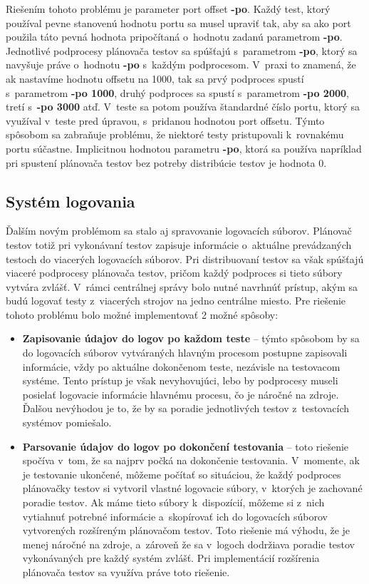 Riešením tohoto problému je parameter port offset \textbf{-po}. 
Každý test, ktorý používal pevne stanovenú hodnotu portu sa musel upraviť tak, aby 
sa ako port použila táto pevná hodnota pripočítaná o~hodnotu zadanú parametrom \textbf{-po}.
Jednotlivé podprocesy plánovača testov sa spúšťajú s~parametrom \textbf{-po}, ktorý sa
navyšuje práve o~hodnotu \textbf{-po} s~každým podprocesom.
V~praxi to znamená, že ak nastavíme hodnotu offsetu na 1000, tak sa prvý podproces spustí s~parametrom
\textbf{-po 1000}, druhý podproces sa spustí s~parametrom \textbf{-po 2000}, tretí s~\textbf{-po 3000} atď.
V~teste sa potom používa štandardné číslo portu, ktorý sa využíval v~teste pred úpravou, s~pridanou hodnotou port offsetu.
Týmto spôsobom sa zabraňuje problému, že niektoré testy pristupovali k~rovnakému portu súčastne.
Implicitnou hodnotou parametru \textbf{-po}, ktorá sa používa napríklad pri spustení plánovača testov
bez potreby distribúcie testov je hodnota 0. 

\subsection*{Systém logovania}
Ďalším novým problémom sa stalo aj spravovanie logovacích súborov. Plánovač testov totiž
pri vykonávaní testov zapisuje informácie o~aktuálne prevádzaných testoch do viacerých logovacích súborov.
Pri distribuovaní testov sa však spúšťajú viaceré podprocesy plánovača testov, pričom každý podproces
si tieto súbory vytvára zvlášť. V~rámci centrálnej správy bolo nutné navrhnúť prístup, akým sa budú
logovať testy z~viacerých strojov na jedno centrálne miesto.
Pre riešenie tohoto problému bolo možné implementovať 2 možné spôsoby:
\begin{itemize}
\item \textbf{Zapisovanie údajov do logov po každom teste} -- týmto spôsobom by sa do logovacích súborov vytváraných hlavným procesom
postupne zapisovali informácie, vždy po aktuálne dokončenom teste, nezávisle na testovacom systéme.
Tento prístup je však nevyhovujúci, lebo by podprocesy museli posielať logovacie informácie hlavnému procesu, čo je náročné na zdroje.
Ďalšou nevýhodou je to, že by sa poradie jednotlivých testov z~testovacích systémov pomiešalo.
\item \textbf{Parsovanie údajov do logov po dokončení testovania} -- toto riešenie spočíva v~tom, že
sa najprv počká na dokončenie testovania. V~momente, ak je testovanie ukončené, môžeme počítať so situáciou,
že každý podproces plánovačky testov si vytvoril vlastné logovacie súbory, v~ktorých je zachované poradie testov.
Ak máme tieto súbory k~dispozícií, môžeme si z~nich vytiahnuť potrebné informácie a~skopírovať ich do logovacích
súborov vytvorených rozšíreným plánovačom testov. Toto riešenie má výhodu, že je menej náročné na zdroje, a~zároveň
že sa v~logoch dodržiava poradie testov vykonávaných pre každý systém zvlášť. 
Pri implementácií rozšírenia plánovača testov sa využíva práve toto riešenie.
\end{itemize} 

